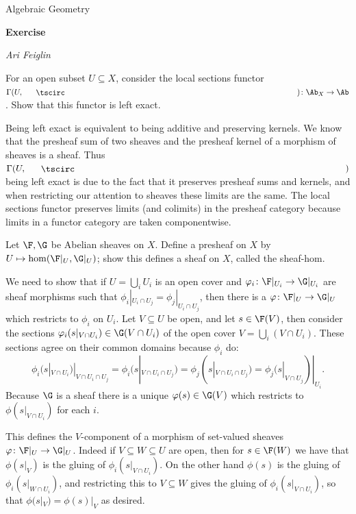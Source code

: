 

\def\printmcount{\the\counter{section}.\the\counter{math counter}}
\setcounter{section}{1}

\centerline{Algebraic Geometry}
\medskip
\centerline{\bf Exercise \the{}}
\smallskip
\centerline{\it Ari Feiglin}

\bprob[title={Hartshorne II.1.8}]

    For an open subset $U\subseteq X$, consider the local sections functor $\Gamma(U,\bul)\colon\Ab_X\to\Ab$.
    Show that this functor is left exact.

\eprob

Being left exact is equivalent to being additive and preserving kernels.
We know that the presheaf sum of two sheaves and the presheaf kernel of a morphism of sheaves is a sheaf.
Thus $\Gamma(U,\bul)$ being left exact is due to the fact that it preserves presheaf sums and kernels, and when restricting our attention to sheaves
these limits are the same.
The local sections functor preserves limits (and colimits) in the presheaf category because limits in a functor category are taken componentwise.

\bprob[title={Hartshorne II.1.15}]

    Let $\F,\G$ be Abelian sheaves on $X$.
    Define a presheaf on $X$ by $U\mapsto\hom(\F|_U,\G|_U)$; show this defines a sheaf on $X$, called the {\emphcolor sheaf-hom}.

\eprop

We need to show that if $U=\bigcup_iU_i$ is an open cover and $\phi_i\colon\F|_{U_i}\to\G|_{U_i}$ are sheaf morphisms such that $\phi_i|_{U_i\cap U_j}=\phi_j|_{U_i\cap U_j}$,
then there is a $\phi\colon\F|_U\to\G|_U$ which restricts to $\phi_i$ on $U_i$.
Let $V\subseteq U$ be open, and let $s\in\F(V)$, then consider the sections $\phi_i(s|_{V\cap U_i})\in\G(V\cap U_i)$ of the open cover $V=\bigcup_i(V\cap U_i)$.
These sections agree on their common domains because $\phi_i$ do:
$$ \phi_i(s|_{V\cap U_i})|_{V\cap U_i\cap U_j} = \phi_i(s|_{V\cap U_i\cap U_j}) = \phi_j(s|_{V\cap U_i\cap U_j}) = \phi_j(s|_{V\cap U_j})|_{U_i} . $$
Because $\G$ is a sheaf there is a unique $\phi(s)\in\G(V)$ which restricts to $\phi(s|_{V\cap U_i})$ for each $i$.

This defines the $V$-component of a morphism of set-valued sheaves $\phi\colon\F|_U\to\G|_U$.
Indeed if $V\subseteq W\subseteq U$ are open, then for $s\in\F(W)$ we have that $\phi(s|_V)$ is the gluing of $\phi_i(s|_{V\cap U_i})$.
On the other hand $\phi(s)$ is the gluing of $\phi_i(s|_{W\cap U_i})$, and restricting this to $V\subseteq W$ gives the gluing of $\phi_i(s|_{V\cap U_i})$,
so that $\phi(s|_V)=\phi(s)|_V$ as desired.

